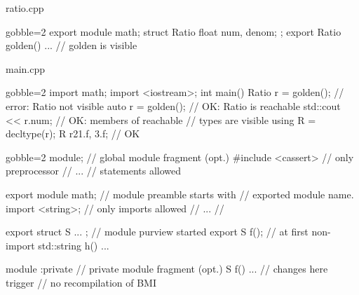 \begin{frame}[fragile]
  \begin{exampleblock}{ratio.cpp}
    \begin{cppcode*}{gobble=2}
      export module math;
      struct Ratio { float num, denom; };
      export Ratio golden() { ... } // golden is visible
    \end{cppcode*}
  \end{exampleblock}
  \begin{exampleblock}{main.cpp}
    \begin{cppcode*}{gobble=2}
      import math;
      import <iostream>;
      int main() {
        Ratio r = golden(); // error: Ratio not visible
        auto r = golden();  // OK: Ratio is reachable
        std::cout << r.num; // OK: members of reachable
                            // types are visible
        using R = decltype(r);
        R r2{1.f, 3.f};     // OK
      }
    \end{cppcode*}
  \end{exampleblock}
\end{frame}

\begin{frame}[fragile]
  \begin{exampleblock}{}
    \small
    \begin{cppcode*}{gobble=2}
      module;                  // global module fragment (opt.)
      #include <cassert>       //   only preprocessor
      // ...                   //   statements allowed

      export module math;      // module preamble starts with
                               //   exported module name.
      import <string>;         //   only imports allowed
      // ...                   //

      export struct S { ... }; // module purview started
      export S f();            //   at first non-import
      std::string h() { ... }

      module :private          // private module fragment (opt.)
      S f() { ... }            //   changes here trigger
                               //   no recompilation of BMI
    \end{cppcode*}
  \end{exampleblock}
\end{frame}

